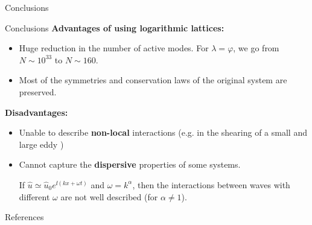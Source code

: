 \documentclass{beamer} %
\begin{document}
{
\begin{frame}[plain]
  \centering\vfill\Huge
  Conclusions
  \vfill
\end{frame}
\addtocounter{framenumber}{-1}
}
\begin{frame}{Conclusions}
  \textbf{Advantages of using logarithmic lattices:}
  \begin{itemize}
    \item Huge reduction in the number of active modes. For $\lambda=\varphi$, we go from $N\sim 10^{33}$ to $N\sim 160$.
    \item Most of the symmetries and conservation laws of the original system are preserved.
  \end{itemize}
  \textbf{Disadvantages:}
  \begin{itemize}
    \item Unable to describe \textbf{non-local} interactions (e.g. in the shearing of a small and large eddy \cite{atomsphere})
    \item Cannot capture the \textbf{dispersive} properties of some systems.

          If $\widehat{u}\simeq \widehat{u}_0 e^{\ii (kx + \omega t)}$ and $\omega = k^\alpha$, then the interactions between waves with different $\omega$ are not well described (for $\alpha\neq 1$).
  \end{itemize}
\end{frame}
\begin{frame}[noframenumbering]{References}
  \printbibliography[heading=none]
\end{frame}
\end{document}
